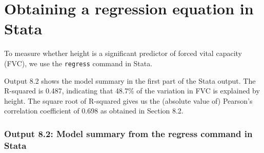 \documentclass[
]{memoir}
\begin{document}
\hypertarget{obtaining-a-regression-equation-in-stata}{%
\section{Obtaining a regression equation in Stata}\label{obtaining-a-regression-equation-in-stata}}

To measure whether height is a significant predictor of forced vital capacity (FVC), we use the \texttt{regress} command in Stata.

Output 8.2 shows the model summary in the first part of the Stata output. The R-squared is 0.487, indicating that 48.7\% of the variation in FVC is explained by height. The square root of R-squared gives us the (absolute value of) Pearson's correlation coefficient of 0.698 as obtained in Section 8.2.

\hypertarget{output-8.2-model-summary-from-the-regress-command-in-stata}{%
\subsubsection{Output 8.2: Model summary from the regress command in Stata}\label{output-8.2-model-summary-from-the-regress-command-in-stata}}
\end{document}
